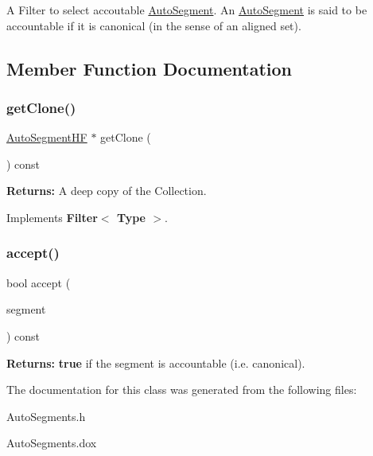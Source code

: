 A Filter to select accoutable \hyperlink{classKatabatic_1_1AutoSegment}{Auto\+Segment}. An \hyperlink{classKatabatic_1_1AutoSegment}{Auto\+Segment} is said to be accountable if it is canonical (in the sense of an aligned set). 

\subsection{Member Function Documentation}
\mbox{\label{classKatabatic_1_1AutoSegments__IsAccountable_a0a6021852a0c5681a7b53dce6b2b87a4}} 
\subsubsection{\texorpdfstring{get\+Clone()}{getClone()}}
{\footnotesize\ttfamily \hyperlink{namespaceKatabatic_a790418bb65a9a13859868df3e8f53598}{Auto\+Segment\+HF} $\ast$ get\+Clone (\begin{DoxyParamCaption}{ }\end{DoxyParamCaption}) const\hspace{0.3cm}{\ttfamily [virtual]}}

{\bfseries Returns\+:} A deep copy of the Collection. 

Implements \textbf{ Filter$<$ Type $>$}.

\mbox{\label{classKatabatic_1_1AutoSegments__IsAccountable_a360f3816925114260aeb7ccdab0ea69e}} 
\subsubsection{\texorpdfstring{accept()}{accept()}}
{\footnotesize\ttfamily bool accept (\begin{DoxyParamCaption}\item[{\hyperlink{classKatabatic_1_1AutoSegment}{Auto\+Segment} $\ast$}]{segment }\end{DoxyParamCaption}) const\hspace{0.3cm}{\ttfamily [virtual]}}

{\bfseries Returns\+:} {\bfseries true} if the {\ttfamily segment} is accountable (i.\+e. canonical). 

The documentation for this class was generated from the following files\+:\begin{DoxyCompactItemize}
\item 
Auto\+Segments.\+h\item 
Auto\+Segments.\+dox\end{DoxyCompactItemize}
